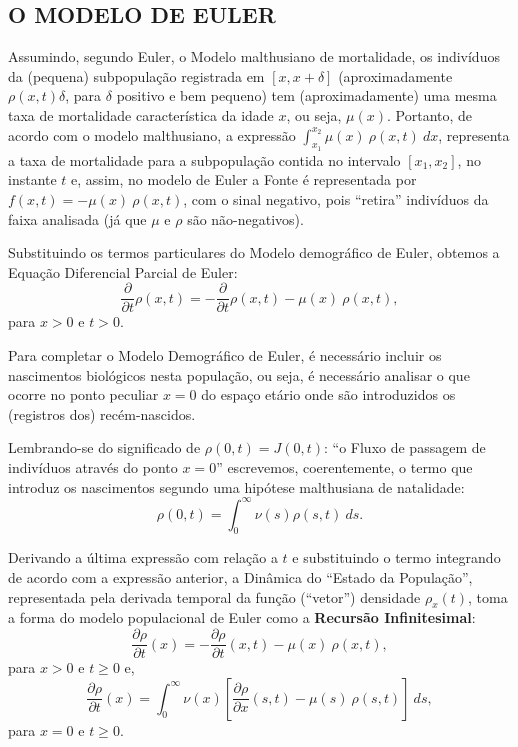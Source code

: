 \subsection{O MODELO DE EULER}

Assumindo, segundo Euler, o Modelo malthusiano de mortalidade, os indivíduos da (pequena) subpopulação registrada em \([x, x+\delta]\) (aproximadamente \(\rho(x,t)\delta\), para \(\delta\) positivo e bem pequeno) tem (aproximadamente) uma mesma taxa de mortalidade característica da idade \(x\), ou seja, \(\mu(x)\). Portanto, de acordo com o modelo malthusiano, a expressão \(\displaystyle\int_{x_1}^{x_2} \mu(x)\ \rho(x,t)\ dx\), representa a taxa de mortalidade para a subpopulação contida no intervalo \([x_1, x_2]\), no instante \(t\) e, assim, no modelo de Euler a Fonte é representada por \(f(x,t) = -\mu(x)\ \rho(x,t)\), com o sinal negativo, pois ``retira'' indivíduos da faixa analisada (já que \(\mu\) e \(\rho\) são não-negativos).

Substituindo os termos particulares do Modelo demográfico de Euler, obtemos a Equação Diferencial Parcial de Euler:
\[\dfrac{\partial }{\partial t} \rho(x,t) = -\dfrac{\partial }{\partial t} \rho(x,t) - \mu(x)\ \rho(x,t),\]
para \(x > 0\) e \(t > 0\).

Para completar o Modelo Demográfico de Euler, é necessário incluir os nascimentos biológicos nesta população, ou seja, é necessário analisar o que ocorre no ponto peculiar \(x = 0\) do espaço etário onde são introduzidos os (registros dos) recém-nascidos.

Lembrando-se do significado de \(\rho(0, t) = J(0, t)\): ``o Fluxo de passagem de indivíduos através do ponto \(x = 0\)'' escrevemos, coerentemente, o termo que introduz os nascimentos segundo uma hipótese malthusiana de natalidade:
\[\rho(0, t) = \displaystyle\int_{0}^{\infty} \nu(s) \rho(s,t)\ ds.\]

Derivando a última expressão com relação a \(t\) e substituindo o termo integrando de acordo com a expressão anterior, a Dinâmica do ``Estado da População'', representada pela derivada temporal da função (``vetor'') densidade \(\rho_x(t)\), toma a forma do modelo populacional de Euler como a \textbf{Recursão Infinitesimal}:
\[\dfrac{\partial \rho}{\partial t} (x) = -\dfrac{\partial \rho}{\partial t} (x,t) - \mu(x)\ \rho(x,t),\]
para \(x>0\) e \(t \ge 0\) e,
\[\dfrac{\partial \rho}{\partial t} (x) = \displaystyle\int_{0}^{\infty} \nu(x) \left[\dfrac{\partial \rho}{\partial x} (s,t) - \mu(s)\ \rho(s,t)\right]\ ds,\]
para \(x=0\) e \(t \ge 0\). 

